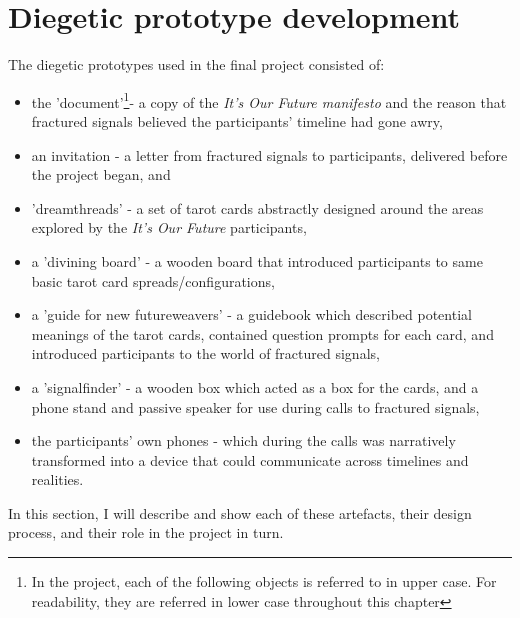 \section{Diegetic prototype development}
\label{sec:8-4-fractured}
The diegetic prototypes used in the final project consisted of:
\begin{itemize}
    \item     the 'document'\footnote{In the project, each of the following objects is referred to in upper case. For readability, they are referred in lower case throughout this chapter}- a copy of the \emph{It's Our Future manifesto} and the reason that fractured signals believed the participants' timeline had gone awry,
    \item an invitation - a letter from fractured signals to participants, delivered before the project began, and
    \item 'dreamthreads' - a set of tarot cards abstractly designed around the areas explored by the \emph{It's Our Future} participants,
    \item a 'divining board' - a wooden board that introduced participants to same basic tarot card spreads/configurations,
    \item     a 'guide for new futureweavers' - a guidebook which described potential meanings of the tarot cards, contained question prompts for each card, and introduced participants to the world of fractured signals,
    \item a 'signalfinder' - a wooden box which acted as a box for the cards, and a phone stand and passive speaker for use during calls to fractured signals,
    \item the participants' own phones - which during the calls was narratively transformed into a device that could communicate across timelines and realities. 
\end{itemize}
In this section, I will describe and show each of these artefacts, their design process, and their role in the project in turn. 

